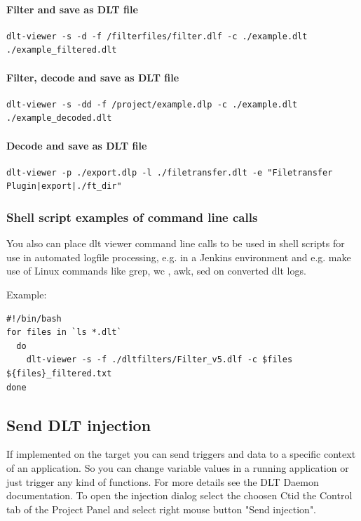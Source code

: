 \documentclass[a4paper,11pt]{article}
\begin{document}
\paragraph{Filter and save as DLT file}
\begin{verbatim}
dlt-viewer -s -d -f /filterfiles/filter.dlf -c ./example.dlt ./example_filtered.dlt
\end{verbatim}

\paragraph{Filter, decode and save as DLT file}
\begin{verbatim}
dlt-viewer -s -dd -f /project/example.dlp -c ./example.dlt ./example_decoded.dlt
\end{verbatim}

\paragraph{Decode and save as DLT file}
\begin{verbatim}
dlt-viewer -p ./export.dlp -l ./filetransfer.dlt -e "Filetransfer Plugin|export|./ft_dir"
\end{verbatim}

\subsubsection{Shell script examples of command line calls}

You also can place dlt viewer command line calls to be used in shell scripts for use
in automated logfile processing, e.g. in a Jenkins environment 
and e.g. make use of Linux commands like grep, wc , awk, sed on converted dlt logs.

Example:
\begin{verbatim}
#!/bin/bash
for files in `ls *.dlt`
  do
    dlt-viewer -s -f ./dltfilters/Filter_v5.dlf -c $files ${files}_filtered.txt
done
\end{verbatim}

\pagebreak

\subsection{Send DLT injection}
If implemented on the target you can send triggers and data to a specific context of an application.
So you can change variable values in a running application or just trigger any kind of functions.
For more details see the DLT Daemon documentation.\linebreak
To open the injection dialog select the choosen Ctid the Control tab of the Project Panel and
select right mouse button "Send injection".
\end{document}
